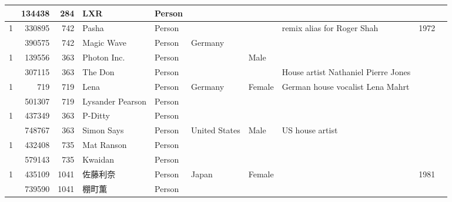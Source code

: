 \begin{tabular}{|r|rrlllllrr|}
         & 134438 &       284 & LXR               & Person &                &          &                                                &              &            \\
\hline
\multirow{2}{*}{1} & 330895 &       742 & Pasha             & Person &                &          & remix alias for Roger Shah                     &         1972 &            \\
         & 390575 &       742 & Magic Wave        & Person & Germany        &          &                                                &              &            \\
\hline
\multirow{2}{*}{1} & 139556 &       363 & Photon Inc.       & Person &                & Male     &                                                &              &            \\
         & 307115 &       363 & The Don           & Person &                &          & House artist Nathaniel Pierre Jones            &              &            \\
\hline
\multirow{2}{*}{1} &    719 &       719 & Lena              & Person & Germany        & Female   & German house vocalist Lena Mahrt               &              &            \\
         & 501307 &       719 & Lysander Pearson  & Person &                &          &                                                &              &            \\
\hline
\multirow{2}{*}{1} & 437349 &       363 & P-Ditty           & Person &                &          &                                                &              &            \\
         & 748767 &       363 & Simon Says        & Person & United States  & Male     & US house artist                                &              &            \\
\hline
\multirow{2}{*}{1} & 432408 &       735 & Mat Ranson        & Person &                &          &                                                &              &            \\
         & 579143 &       735 & Kwaidan           & Person &                &          &                                                &              &            \\
\hline
\multirow{2}{*}{1} & 435109 &      1041 & 佐藤利奈              & Person & Japan          & Female   &                                                &         1981 &            \\
         & 739590 &      1041 & 棚町薫              & Person &                &          &                                                &              &            \\

\end{tabular}
